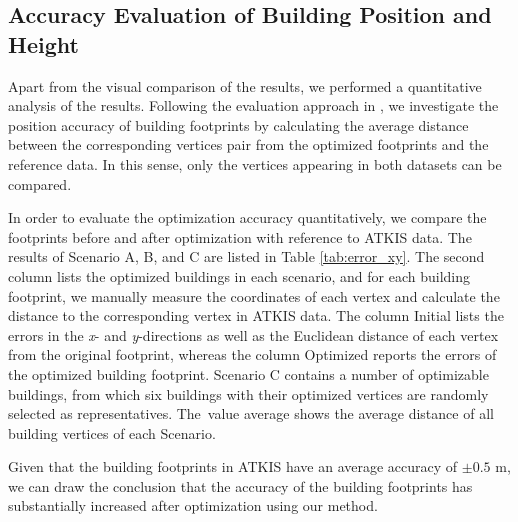 \subsection{Accuracy Evaluation of Building Position and Height}
Apart from the visual comparison of the results, we performed a quantitative analysis of the results. Following the evaluation approach in \cite{fan2014quality}, we investigate the position accuracy of building footprints by calculating the average distance between the corresponding vertices pair from the optimized footprints and the reference data. In this sense, only the vertices appearing in both datasets can be compared.

In order to evaluate the optimization accuracy quantitatively, we compare the footprints before and after optimization with reference to ATKIS data. The results of Scenario A, B, and C are listed in Table \ref{tab:error_xy}. The second column lists the optimized buildings in each scenario, and for each building footprint, we manually measure the coordinates of each vertex and calculate the distance to the corresponding vertex in ATKIS data. The column Initial lists the errors in the \emph{x}- and \emph{y}-directions as well as the Euclidean distance of each vertex from the original footprint, whereas the column Optimized reports the errors of the optimized building footprint. Scenario C contains a number of optimizable buildings, from which six buildings with their optimized vertices are randomly selected as representatives. The~value average shows the average distance of all building vertices of each Scenario. 

Given that the building footprints in ATKIS have an average accuracy of $\pm{0.5}$ m, we can draw the conclusion that the accuracy of the building footprints has substantially increased after optimization using our method.

